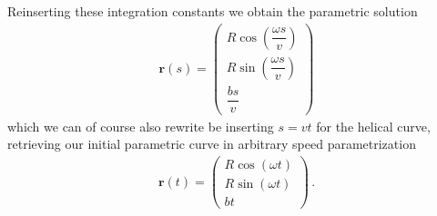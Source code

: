 \documentclass[11pt, DINA4, fleqn]{amsart}
\def\vr{\boldsymbol{r}\xspace}
\begin{document}
Reinserting these integration constants we obtain the parametric solution
\begin{align}
\vr(s) = \begin{pmatrix}
R\cos\left(\dfrac{\omega s}{v}\right) \\
R\sin\left(\dfrac{\omega s}{v}\right) \\
\dfrac{bs}{v}
\end{pmatrix}
\end{align}
which we can of course also rewrite be inserting $s = vt$ for the helical curve,
retrieving our initial parametric curve in arbitrary speed parametrization
\begin{align}
\vr(t) = \begin{pmatrix}
R\cos\left(\omega t\right) \\
R\sin\left(\omega t\right) \\
bt
\end{pmatrix} \, .
\end{align}
\end{document}
